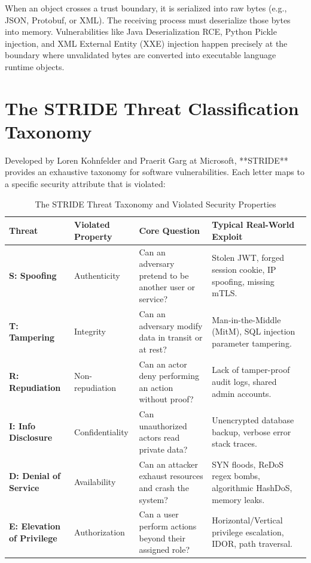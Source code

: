 \begin{underthehoodbox}
When an object crosses a trust boundary, it is serialized into raw bytes (e.g., JSON, Protobuf, or XML). The receiving process must deserialize those bytes into memory. Vulnerabilities like Java Deserialization RCE, Python Pickle injection, and XML External Entity (XXE) injection happen precisely at the boundary where unvalidated bytes are converted into executable language runtime objects.
\end{underthehoodbox}

\section{The STRIDE Threat Classification Taxonomy}

Developed by Loren Kohnfelder and Praerit Garg at Microsoft, **STRIDE** provides an exhaustive taxonomy for software vulnerabilities. Each letter maps to a specific security attribute that is violated:

\begin{table}[htbp]
\centering\small
\begin{tabular}{lllp{5.5cm}}
\toprule
\textbf{Threat} & \textbf{Violated Property} & \textbf{Core Question} & \textbf{Typical Real-World Exploit} \\
\midrule
\textbf{S: Spoofing} & Authenticity & Can an adversary pretend to be another user or service? & Stolen JWT, forged session cookie, IP spoofing, missing mTLS. \\
\textbf{T: Tampering} & Integrity & Can an adversary modify data in transit or at rest? & Man-in-the-Middle (MitM), SQL injection parameter tampering. \\
\textbf{R: Repudiation} & Non-repudiation & Can an actor deny performing an action without proof? & Lack of tamper-proof audit logs, shared admin accounts. \\
\textbf{I: Info Disclosure} & Confidentiality & Can unauthorized actors read private data? & Unencrypted database backup, verbose error stack traces. \\
\textbf{D: Denial of Service} & Availability & Can an attacker exhaust resources and crash the system? & SYN floods, ReDoS regex bombs, algorithmic HashDoS, memory leaks. \\
\textbf{E: Elevation of Privilege} & Authorization & Can a user perform actions beyond their assigned role? & Horizontal/Vertical privilege escalation, IDOR, path traversal. \\
\bottomrule
\end{tabular}
\caption{The STRIDE Threat Taxonomy and Violated Security Properties}
\label{tab:stride-taxonomy}
\end{table}

